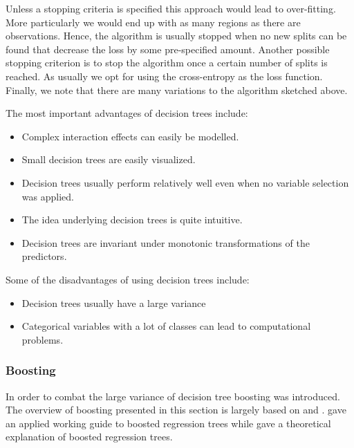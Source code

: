 Unless a stopping criteria is specified this approach would lead to over-fitting. More particularly we would end up with as many regions as there are observations. Hence, the algorithm is usually stopped when no new splits can be found that decrease the loss by some pre-specified amount. Another possible stopping criterion is to stop the algorithm once a certain number of splits is reached. As usually we opt for using the cross-entropy as the loss function. Finally, we note that there are many variations to the algorithm sketched above.

The most important advantages of decision trees include:
\begin{itemize}
\item Complex interaction effects can easily be modelled.
\item Small decision trees are easily visualized.
\item Decision trees usually perform relatively well even when no variable selection was applied.
\item The idea underlying decision trees is quite intuitive.
\item Decision trees are invariant under monotonic transformations of the predictors.
\end{itemize}

Some of the disadvantages of using decision trees include:
\begin{itemize}
\item Decision trees usually have a large variance
\item Categorical variables with a lot of classes can lead to computational problems.
\end{itemize}

\subsubsection{Boosting}
\label{sec:Boosting}
In order to combat the large variance of decision tree boosting was introduced. The overview of boosting presented in this section is largely based on \cite{elith_working_2008} and \cite{friedman_additive_2000}. \cite{elith_working_2008} gave an applied working guide to boosted regression trees while \cite{friedman_additive_2000} gave a theoretical explanation of boosted regression trees.\\

